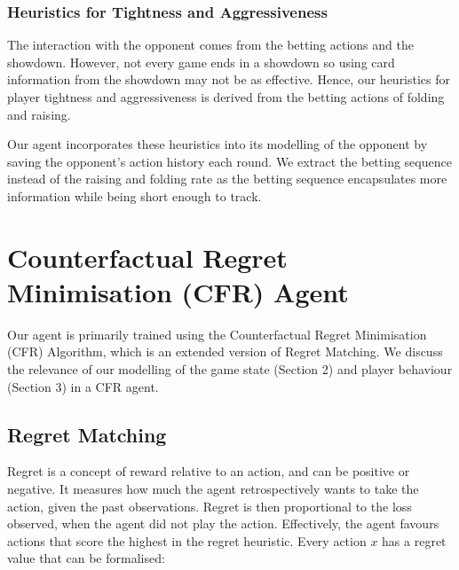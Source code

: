 \documentclass{article}
\begin{document}
\subsubsection{Heuristics for Tightness and Aggressiveness}
The interaction with the opponent comes from the betting actions and the showdown. However, not every game ends in a showdown so using card information from the showdown may not be as effective. Hence, our heuristics for player tightness and aggressiveness is derived from the betting actions of folding and raising.


Our agent incorporates these heuristics into its modelling of the opponent by saving the opponent's action history each round. We extract the betting sequence instead of the raising and folding rate as the betting sequence encapsulates more information while being short enough to track.

\section{Counterfactual Regret Minimisation (CFR) Agent}

Our agent is primarily trained using the Counterfactual Regret Minimisation (CFR) Algorithm, which is an extended version of Regret Matching. We discuss the relevance of our modelling of the game state (Section 2) and player behaviour (Section 3) in a CFR agent.

\subsection{Regret Matching}

Regret is a concept of reward relative to an action, and can be positive or negative. It measures how much the agent retrospectively wants to take the action, given the past observations. Regret is then proportional to the loss observed, when the agent did not play the action. Effectively, the agent favours actions that score the highest in the regret heuristic. Every action $x$ has a regret value that can be formalised:
\end{document}
